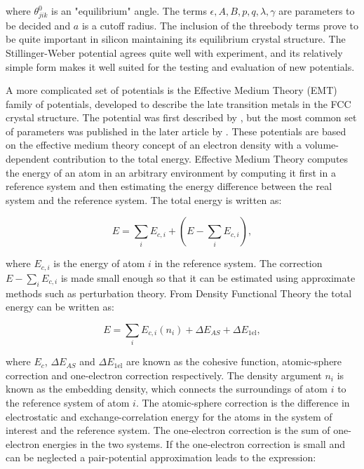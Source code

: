 where $\theta_{jik}^0$ is an "equilibrium" angle.
The terms $\epsilon, A, B, p, q, \lambda, \gamma$ are parameters
to be decided and $a$ is a cutoff radius.
The inclusion of the threebody terms prove to be quite important
in silicon maintaining its equilibrium crystal structure.
The Stillinger-Weber potential agrees quite well with experiment,
and its relatively simple form makes it well suited for
the testing and evaluation of new potentials.
\par
A more complicated set of potentials is the Effective Medium Theory (EMT)
family of potentials, developed to describe the late transition
metals in the FCC crystal structure. The potential was first
described by \parencite[Jacobsen, K.W.; Nørskov, J.K. and
Puska, M.J.]{jacobsen1987interatomic}, but the most common set of parameters
was published in the later article by \parencite[Jacobsen, K.W.;
Stoltze, P. and Nørskov, J.K.]{jacobsen1996semi}.
These potentials are based on the effective medium theory concept
of an electron density with a volume-dependent contribution to
the total energy.
Effective Medium Theory computes the energy of an atom in an
arbitrary environment by computing it first in a reference system
and then estimating the energy difference between the real system
and the reference system.
The total energy is written as:

\begin{equation}
    E = \sum_i E_{c,i} + \left( E - \sum_i E_{c,i} \right) ,
\end{equation}

where $E_{c,i}$ is the energy of atom $i$ in the reference system.
The correction $E - \sum_i E_{c,i}$ is made small enough so that
it can be estimated using approximate methods such as perturbation theory.
From Density Functional Theory the total energy can be written as:

\begin{equation}
    E = \sum_i E_{c,i}(n_i) + \Delta E_{AS} + \Delta E_{\text{1el}} ,
\end{equation}

where $E_c$, $\Delta E_{AS}$ and $\Delta E_{\text{1el}}$ are known as
the cohesive function, atomic-sphere correction and one-electron correction
respectively. The density argument $n_i$ is known as the embedding density,
which connects the surroundings of atom $i$ to the reference system 
of atom $i$. The atomic-sphere correction is the difference in
electrostatic and exchange-correlation energy for the atoms in the system
of interest and the reference system.
The one-electron correction is the sum of one-electron energies in the two
systems. If the one-electron correction is small and can be neglected
a pair-potential approximation leads to the expression:


